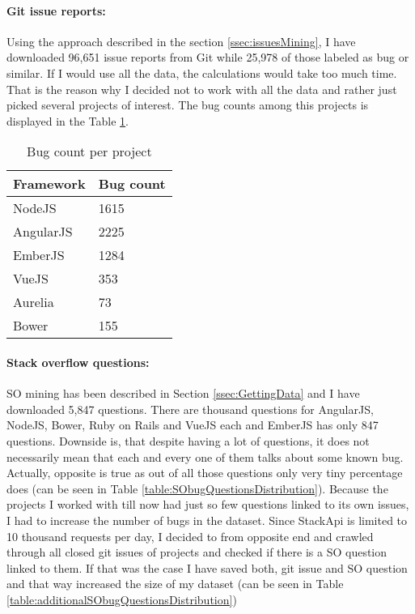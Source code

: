 \paragraph{Git issue reports:}
Using the approach described in the section \ref{ssec:issuesMining}, I have downloaded 96,651 issue reports from Git while 25,978 of those labeled as bug or similar. If I would use all the data, the calculations would take too much time. That is the reason why I decided not to work with all the data and rather just picked several projects of interest. The bug counts among this projects is displayed in the Table \ref{table:gitProjectIssuesDistribution}.


\begin{table}[H]
\centering
\begin{tabular}{ |p{3cm}||p{3cm}|}
 \hline
\textbf{ Framework }& \textbf{Bug count}\\
 \hline
 NodeJS   & 1615\\ \hline
 AngularJS &   2225 \\ \hline
 EmberJS & 1284\\ \hline
 VueJS & 353\\ \hline
 Aurelia & 73\\ \hline
 Bower & 155\\ \hline
\end{tabular}
\caption{Bug count per project}
\label{table:gitProjectIssuesDistribution}
\end{table}

\paragraph{Stack overflow questions:}
SO mining has been described in Section \ref{ssec:GettingData} and I have downloaded 5,847 questions. There are thousand questions for AngularJS, NodeJS, Bower, Ruby on Rails and VueJS each and EmberJS has only 847 questions. Downside is, that despite having a lot of questions, it does not necessarily mean that each and every one of them talks about some known bug. Actually, opposite is true as out of all those questions only very tiny percentage does (can be seen in Table \ref{table:SObugQuestionsDistribution}). Because the projects I worked with till now had just so few questions linked to its own issues, I had to increase the number of bugs in the dataset. Since StackApi is limited to 10 thousand requests per day, I decided to from opposite end and crawled through all closed git issues of projects and checked if there is a SO question linked to them. If that was the case I have saved both, git issue and SO question and that way increased the size of my dataset (can be seen in Table \ref{table:additionalSObugQuestionsDistribution})

